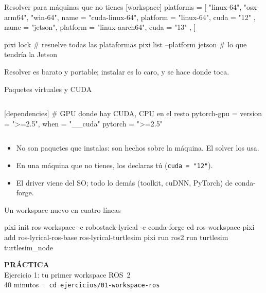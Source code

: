 \documentclass[aspectratio=169]{beamer}
\newcommand{\practicaframe}[2]{%
\begin{frame}
  \centering
  \vfill
  {\Large \textbf{PRÁCTICA}}\\[1em]
  {\large #1}\\[0.5em]
  {\color{halfgray} #2}
  \vfill
\end{frame}%
}
\begin{document}
\begin{frame}[fragile]{Resolver para máquinas que no tienes}
[workspace]
platforms = [
  "linux-64", "osx-arm64", "win-64",
  { name = "cuda-linux-64", platform = "linux-64", cuda = "12" },
  { name = "jetson", platform = "linux-aarch64", cuda = "13" },
]
\begin{terminal}
pixi lock                          # resuelve todas las plataformas
pixi list --platform jetson        # lo que tendría la Jetson
\end{terminal}
\vfill
\centering Resolver es barato y portable; instalar es lo caro, y se hace donde toca.
\end{frame}

\begin{frame}[fragile]{Paquetes virtuales y CUDA}
\begin{columns}[T]
[dependencies]
# GPU donde hay CUDA, CPU en el resto
pytorch-gpu = { version = ">=2.5", when = "__cuda" }
pytorch = ">=2.5"
\end{columns}
\vfill
\begin{itemize}
    \item No son paquetes que instalas: son hechos sobre la máquina. El solver los usa.
    \item En una máquina que no tienes, los declaras tú (\lstinline|cuda = "12"|).
    \item El driver viene del SO; todo lo demás (toolkit, cuDNN, PyTorch) de conda-forge.
\end{itemize}
\end{frame}

\begin{frame}[fragile]{Un workspace nuevo en cuatro líneas}
\vfill
\begin{terminal}
pixi init ros-workspace -c robostack-lyrical -c conda-forge
cd ros-workspace
pixi add ros-lyrical-ros-base ros-lyrical-turtlesim
pixi run ros2 run turtlesim turtlesim_node
\end{terminal}
\vfill
\end{frame}

\practicaframe{Ejercicio 1: tu primer workspace ROS~2}{40 minutos · \texttt{cd ejercicios/01-workspace-ros}}
\end{document}

